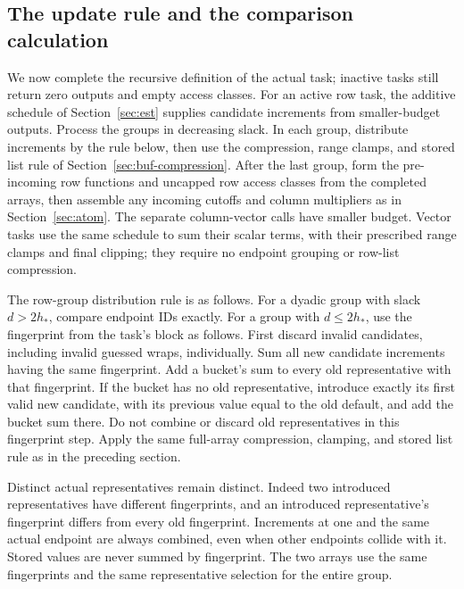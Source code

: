 \subsection{The update rule and the comparison calculation}

We now complete the recursive definition of the actual task; inactive
tasks still return zero outputs and empty access classes.  For an active
row task, the additive schedule of Section~\ref{sec:est} supplies
candidate increments from smaller-budget outputs.  Process the groups in
decreasing slack.  In each group, distribute increments by the rule below,
then use the compression, range clamps, and stored list rule of
Section~\ref{sec:buf-compression}.  After the last group, form the
pre-incoming row functions and uncapped row access classes from the completed arrays,
then assemble any incoming cutoffs and column multipliers as in
Section~\ref{sec:atom}.  The separate column-vector calls have smaller
budget.  Vector tasks use the same schedule to sum their scalar terms,
with their prescribed range clamps and final clipping; they require no
endpoint grouping or row-list compression.

The row-group distribution rule is as follows.
For a dyadic group with slack $d>2h_*$, compare endpoint IDs exactly.  For a
group with $d\le2h_*$, use the fingerprint from the task's block as follows.
First discard invalid candidates, including invalid guessed wraps,
individually.  Sum all new candidate increments having the same fingerprint.
Add a bucket's sum to every old representative with that fingerprint.  If the
bucket has no old representative, introduce exactly its first valid new
candidate, with its previous value equal to the old default, and add the
bucket sum there.  Do not combine or discard old representatives in this
fingerprint step.  Apply the same full-array compression, clamping, and stored list
rule as in the preceding section.

Distinct actual representatives remain distinct.  Indeed two introduced
representatives have different fingerprints, and an introduced representative's
fingerprint differs from every old fingerprint.  Increments at one and the same actual
endpoint are always combined, even when other endpoints collide with it.
Stored values are never summed by fingerprint.  The two arrays use the same fingerprints
and the same representative selection for the entire group.

